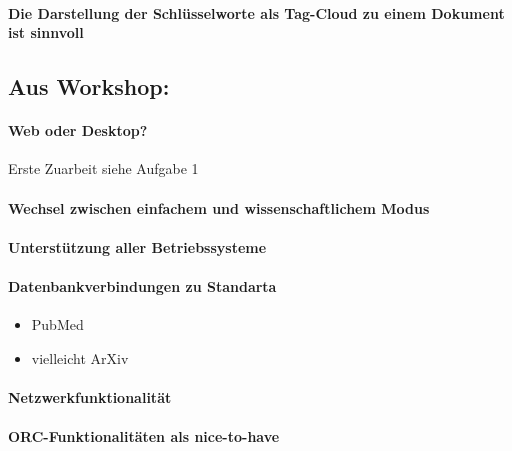 \documentclass[a4paper,12pt]{article}
\begin{document}
\paragraph{Die Darstellung der Schlüsselworte als Tag-Cloud zu einem Dokument ist sinnvoll}

\subsection{Aus Workshop:}
\paragraph{Web oder Desktop?}
Erste Zuarbeit siehe Aufgabe 1
\paragraph{Wechsel zwischen einfachem und wissenschaftlichem Modus}
\paragraph{Unterstützung aller Betriebssysteme}
\paragraph{Datenbankverbindungen zu Standarta}
\begin{itemize}
\item PubMed
\item vielleicht ArXiv
\end{itemize}

\paragraph{Netzwerkfunktionalität}

\paragraph{ORC-Funktionalitäten als nice-to-have}

\paragraph{}
\paragraph{}
\paragraph{}
\paragraph{}
\end{document}

